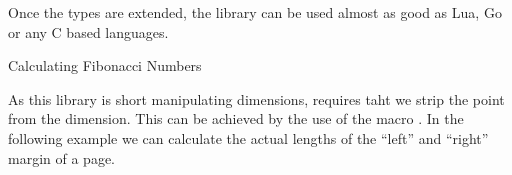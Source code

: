 \documentclass[twoside,11pt]{book}
\begin{document}
Once the types are extended, the library can be used almost as good as Lua, Go or any C based 
languages.



\begin{texexample}{Calculating Fibonacci Numbers}{}
\setcounter{tmath}{5}
\end{texexample}



As this library is short manipulating dimensions, requires taht we strip the point from
the dimension. This can be achieved by the use of the \latexe macro .
In the following example we can calculate the actual lengths of the \enquote{left} and \enquote{right}
margin of a page. 
\end{document}
